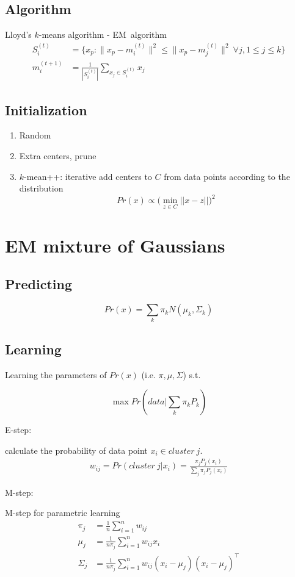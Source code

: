 \documentclass[a4paper]{report}
\begin{document}
\subsection{Algorithm}
Lloyd’s $k$-means algorithm - EM\ algorithm
\begin{align*}
S_i^{(t)}& = \big \{ x_p : \| x_p - m^{(t)}_i \|^2 \le \big \| x_p - m^{(t)}_j \|^2 \ \forall j, 1 \le j \le k \big\}  \\
m^{(t+1)}_i &= \frac{1}{|S^{(t)}_i|} \sum_{x_j \in S^{(t)}_i} x_j 
\end{align*}

\subsection{Initialization}
\begin{enumerate}
\item Random
\item Extra centers, prune
\item $k$-mean++: iterative add centers to $C$ from data points according to the distribution 
$$
Pr(x) \propto \big(\min_{z\in C}||x-z||\big)^2
$$


\end{enumerate}
\section{EM mixture of Gaussians}
\subsection{Predicting}
$$
Pr(x) = \sum_k \pi_k N(\mu_k, \Sigma_k)
$$

\subsection{Learning}
Learning the parameters of $Pr(x)$ (i.e. $\pi, \mu, \Sigma$) s.t.

$$
\max Pr(data|\sum_k \pi_k P_k)
$$

E-step:

calculate the probability of data point $x_i \in cluster~j$. 
\begin{align*}
w_{ij} = Pr(cluster~j|x_i) = \frac{\pi_j P_j(x_i)}{\sum_j \pi_j P_j(x_i)}
\end{align*}

M-step:

M-step for parametric learning 
\begin{align*}
\pi_j &= \frac{1}{n} \sum_{i=1}^n w_{ij} \\
\mu_j &= \frac{1}{n\pi_j} \sum_{i=1}^n w_{ij} x_i \\
\Sigma_j &= \frac{1}{n\pi_j} \sum_{i=1}^n w_{ij}(x_i-\mu_j)(x_i-\mu_j)^\top
\end{align*}
\begin{align*}

\end{align*}
\end{document}
